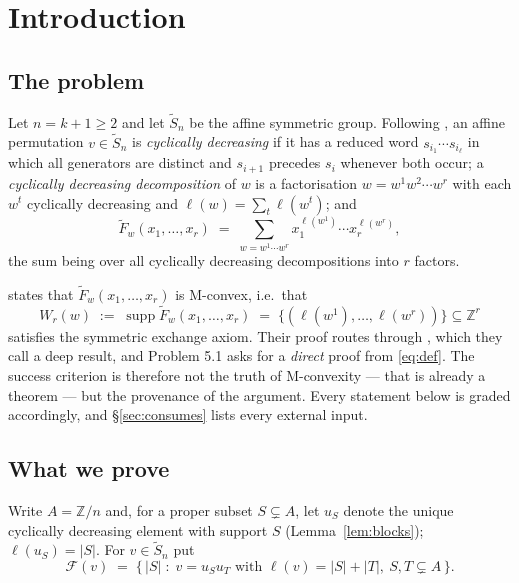\documentclass[11pt]{article}
\theoremstyle{definition}
\newcommand{\Z}{\mathbb{Z}}
\newcommand{\Saff}{\widetilde{S}_{n}}
\newcommand{\Fw}{\widetilde{F}_{w}}
\newcommand{\supp}{\operatorname{supp}}
\begin{document}
\section{Introduction}

\subsection{The problem}

Let $n=k+1\ge 2$ and let $\Saff$ be the affine symmetric group. Following
\cite[(def-affine-stanley)]{WZZ}, an affine permutation $v\in\Saff$ is \emph{cyclically
decreasing} if it has a reduced word $s_{i_1}\cdots s_{i_\ell}$ in which all generators are
distinct and $s_{i+1}$ precedes $s_i$ whenever both occur; a \emph{cyclically decreasing
decomposition} of $w$ is a factorisation $w=w^1w^2\cdots w^r$ with each $w^t$ cyclically
decreasing and $\ell(w)=\sum_t\ell(w^t)$; and
\begin{equation}\label{eq:def}
  \Fw(x_1,\dots,x_r)\;=\;\sum_{w=w^1\cdots w^r} x_1^{\ell(w^1)}\cdots x_r^{\ell(w^r)},
\end{equation}
the sum being over all cyclically decreasing decompositions into $r$ factors.

\cite[Thm.~4.7]{WZZ} states that $\Fw(x_1,\dots,x_r)$ is M-convex, i.e.\ that
\[
  W_r(w)\;:=\;\supp \Fw(x_1,\dots,x_r)\;=\;\bigl\{(\ell(w^1),\dots,\ell(w^r))\bigr\}\subseteq\Z^r
\]
satisfies the symmetric exchange axiom. Their proof routes through
\cite[Cor.~8.5]{Lam2008}, which they call a deep result, and Problem 5.1 asks for a
\emph{direct} proof from \eqref{eq:def}. The success criterion is therefore not the truth of
M-convexity --- that is already a theorem --- but the provenance of the argument. Every
statement below is graded accordingly, and \S\ref{sec:consumes} lists every external input.

\subsection{What we prove}

Write $A=\Z/n$ and, for a proper subset $S\subsetneq A$, let $u_S$ denote the unique cyclically
decreasing element with support $S$ (Lemma~\ref{lem:blocks}); $\ell(u_S)=|S|$. For
$v\in\Saff$ put
\[
  \mathcal F(v)\;=\;\bigl\{\,|S| \;:\; v=u_Su_T \text{ with } \ell(v)=|S|+|T|,\ S,T\subsetneq A \,\bigr\}.
\]
\end{document}
